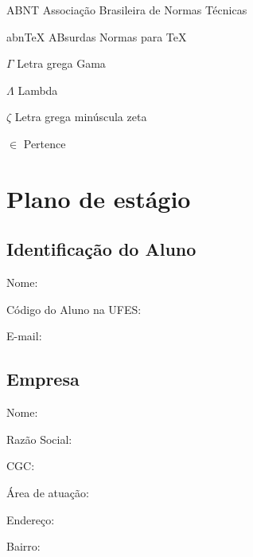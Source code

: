 \documentclass[
	12pt,				%
	openright,			%
	oneside,			%
	a4paper,			%
	english,			%
	french,				%
	spanish,			%
	brazil				%
	]{abntex2}
\begin{document}
\listoftables*
\cleardoublepage

\begin{siglas}
  \item[ABNT] Associação Brasileira de Normas Técnicas
  \item[abnTeX] ABsurdas Normas para TeX
\end{siglas}

\begin{simbolos}
  \item[$ \Gamma $] Letra grega Gama
  \item[$ \Lambda $] Lambda
  \item[$ \zeta $] Letra grega minúscula zeta
  \item[$ \in $] Pertence
\end{simbolos}


\textual

\chapter[Plano de estágio]{Plano de estágio}
\section{Identificação do Aluno}

\parindent=0pt

Nome:\imprimirautor

Código do Aluno na UFES:

E-mail:

\section{Empresa}
Nome:

Razão Social:

CGC:

Área de atuação:

Endereço:

Bairro:
\end{document}
